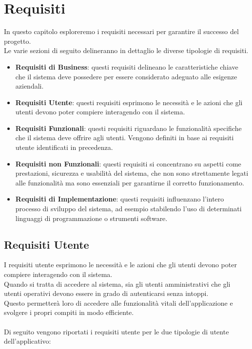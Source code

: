 \section{Requisiti}

In questo capitolo esploreremo i requisiti necessari per garantire il successo del progetto.\\
Le varie sezioni di seguito delineranno in dettaglio le diverse tipologie di requisiti.

\begin{itemize}
    \item \textbf{Requisiti di Business}: questi requisiti delineano le caratteristiche chiave che il sistema deve possedere per essere considerato adeguato alle esigenze aziendali.
    \item \textbf{Requisiti Utente}: questi requisiti esprimono le necessità e le azioni che gli utenti devono poter compiere interagendo con il sistema.
    \item \textbf{Requisiti Funzionali}: questi requisiti riguardano le funzionalità specifiche che il sistema deve offrire agli utenti. Vengono definiti in base ai requisiti utente identificati in precedenza.
    \item \textbf{Requisiti non Funzionali}: questi requisiti si concentrano su aspetti come prestazioni, sicurezza e usabilità del sistema, che non sono strettamente legati alle funzionalità ma sono essenziali per garantirne il corretto funzionamento.
    \item \textbf{Requisiti di Implementazione}: questi requisiti influenzano l'intero processo di sviluppo del sistema, ad esempio stabilendo l'uso di determinati linguaggi di programmazione o strumenti software.
\end{itemize}

\subsection{Requisiti Utente}

I requisiti utente esprimono le necessità e le azioni che gli utenti devono
poter compiere interagendo con il sistema.\\
Quando si tratta di accedere al sistema, sia gli utenti amministrativi che gli utenti
operativi devono essere in grado di autenticarsi senza intoppi.\\ Questo permetterà loro di
accedere alle funzionalità vitali dell'applicazione e svolgere i propri compiti in modo efficiente.\\
\\
Di seguito vengono riportati i requisiti utente per le due tipologie di utente dell'applicativo:
